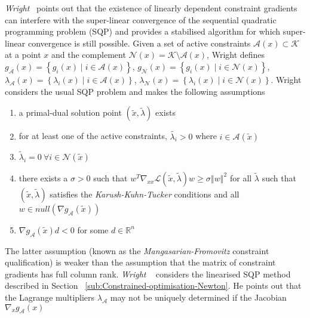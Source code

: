 \documentclass[a4paper,twoside,10pt,english]{report}
\begin{document}
\emph{Wright}~\cite{Wright_SuperLinearConvergenceSQPDegenerateSolution} points
out that the existence of linearly dependent constraint gradients
can interfere with the super-linear convergence of the sequential quadratic
programming problem (SQP) and provides a stabilised algorithm
for which super-linear convergence is still possible. Given a set of
active constraints $\mathcal{A}\left(x\right)\subset\mathcal{K}$
at a point $x$ and the complement $\mathcal{N}\left(x\right)=\mathcal{K}\setminus\mathcal{A}\left(x\right)$,
Wright defines $g_{\mathcal{A}}\left(x\right)=\left\{ g_{i}\left(x\right)\mid i\in\mathcal{A}\left(x\right)\right\} $,
$g_{\mathcal{N}}\left(x\right)=\left\{ g_{i}\left(x\right)\mid i\in\mathcal{N}\left(x\right)\right\} $,
$\lambda_{\mathcal{A}}\left(x\right)=\left\{ \lambda_{i}\left(x\right)\mid i\in\mathcal{A}\left(x\right)\right\} $,
$\lambda_{\mathcal{N}}\left(x\right)=\left\{ \lambda_{i}\left(x\right)\mid i\in\mathcal{N}\left(x\right)\right\} $.
Wright considers the usual SQP problem and makes the following assumptions 
\begin{enumerate}
\item a primal-dual solution point $\left(\tilde{x},\tilde{\lambda}\right)$
exists
\item for at least one of the active constraints, $\tilde{\lambda_{i}}>0$
where $i\in\mathcal{A}\left(\tilde{x}\right)$
\item $\tilde{\lambda}_{i} = 0 ~ \forall i\in\mathcal{N}\left(\tilde{x}\right)$ 
\item there exists a $\sigma>0$ such that $w^{T}\nabla_{xx}\mathcal{L}\left(\tilde{x},\tilde{\lambda}\right)w\ge\sigma\left\Vert w\right\Vert ^{2}$
for all $\tilde{\lambda}$ such that $\left(\tilde{x},\tilde{\lambda}\right)$
satisfies the \emph{Karush-Kuhn-Tucker} conditions and all $w \in null\left(\nabla g_{\mathcal{A}}\left(\tilde{x}\right)\right)$
\item $\nabla g_{\mathcal{A}}\left(\tilde{x}\right)d<0$ for some $d\in\mathbb{R}^{n}$ 
\end{enumerate}
The latter assumption (known as the \emph{Mangasarian-Fromovitz }constraint
qualification) is weaker than the assumption that the matrix of constraint
gradients has full column rank. \emph{Wright} 
~\cite{Wright_SuperLinearConvergenceSQPDegenerateSolution}
considers the linearised SQP method described in Section 
~\ref{sub:Constrained-optimisation-Newton}.
He points out that the Lagrange multipliers $\lambda_{\mathcal{A}}$
may not be uniquely determined if the Jacobian 
$\nabla_{x}g_{\mathcal{A}}\left(x\right)$
\end{document}
